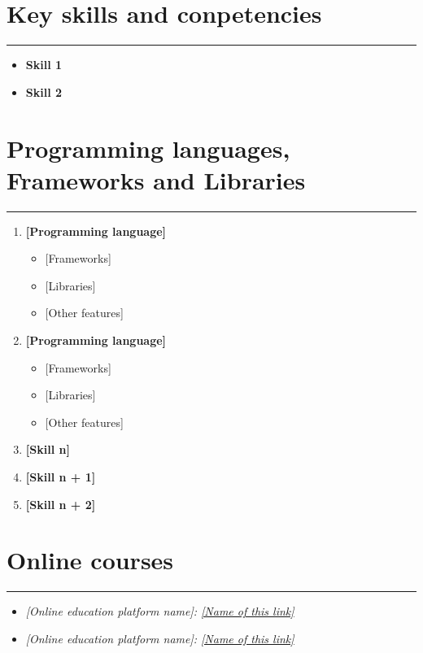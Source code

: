 \documentclass[10pt,a4paper]{report}
\begin{document}
\section*{Key skills and conpetencies}
\hrule\bigskip
\begin{itemize}[label={}]

\item {\textbf{Skill 1}}

\item {\textbf{Skill 2}}


\end{itemize}

\section*{Programming languages, Frameworks and Libraries}
\hrule\bigskip

\begin{enumerate}

\item {
	\textbf{[Programming language]}
	\begin{itemize}[label={}]
		\item {[Frameworks]}
		\item {[Libraries]}
		\item {[Other features]}
	\end{itemize}
}

\item {
	\textbf{[Programming language]}
	\begin{itemize}[label={}]
		\item {[Frameworks]}
		\item {[Libraries]}
		\item {[Other features]}
	\end{itemize}
}

\item {\textbf{[Skill n]}}
\item {\textbf{[Skill n + 1]}}
\item {\textbf{[Skill n + 2]}}


\end{enumerate}


\section*{Online courses}
\smallskip\hrule\bigskip

\begin{itemize}[label={ }]


\item {\textit{[Online education platform name]: 
		\href{[Your profile link]}{[Name of this link]}}}
			
\item {\textit{[Online education platform name]:
		\href{[Your profile link]}{[Name of this link]}}}
		
			
\end{itemize}
\end{document}
